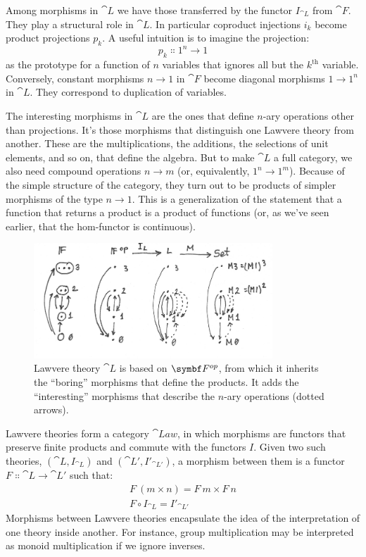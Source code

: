 Among morphisms in $\cat{L}$ we have those transferred by the functor
$I_{\cat{L}}$ from $\cat{F}$. They play a structural role in $\cat{L}$. In
particular coproduct injections $i_k$ become product projections
$p_k$. A useful intuition is to imagine the projection:
\[p_k \Colon 1^n \to 1\]
as the prototype for a function of $n$ variables that ignores all but the
$k^\text{th}$ variable. Conversely, constant morphisms $n \to 1$
in $\cat{F}$ become diagonal morphisms $1 \to 1^n$ in
$\cat{L}$. They correspond to duplication of variables.

The interesting morphisms in $\cat{L}$ are the ones that define $n$-ary
operations other than projections. It's those morphisms that distinguish
one Lawvere theory from another. These are the multiplications, the
additions, the selections of unit elements, and so on, that define the
algebra. But to make $\cat{L}$ a full category, we also need compound
operations $n \to m$ (or, equivalently,
$1^n \to 1^m$). Because of the simple structure of
the category, they turn out to be products of simpler morphisms of the
type $n \to 1$. This is a generalization of the
statement that a function that returns a product is a product of
functions (or, as we've seen earlier, that the hom-functor is
continuous).

\begin{figure}[H]
\centering
\includegraphics[width=0.8\textwidth]{images/lawvere1.png}
\caption{Lawvere theory $\cat{L}$ is based on $\Fop$, from which
it inherits the ``boring'' morphisms that define the products. It adds
the ``interesting'' morphisms that describe the $n$-ary operations (dotted
arrows).}
\end{figure}

Lawvere theories form a category $\cat{Law}$, in which morphisms are
functors that preserve finite products and commute with the functors
$I$. Given two such theories, $(\cat{L}, I_{\cat{L}})$ and
$(\cat{L'}, I'_{\cat{L'}})$, a morphism between them is a
functor $F \Colon \cat{L} \to \cat{L'}$ such that:
\begin{gather*}
F\ (m \times n) = F\ m \times F\ n \\
F \circ I_{\cat{L}} = I'_{\cat{L'}}
\end{gather*}
Morphisms between Lawvere theories encapsulate the idea of the
interpretation of one theory inside another. For instance, group
multiplication may be interpreted as monoid multiplication if we ignore
inverses.

